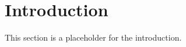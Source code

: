 \section{Introduction}
\label{sec:introduction}

This section is a placeholder for the introduction.

